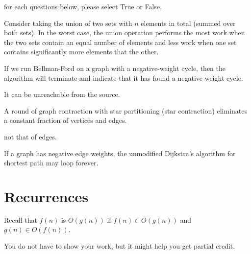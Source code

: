 \begin{problem}

for each questions below, please select True or False.

\asktf

Consider taking the union of two sets with $n$ elements in total
(summed over both sets).  In the worst case, the union operation
performs the most work when the two sets contain an equal number of
elements and less work when one set contains significantly more
elements that the other.

\solt



\asktf

If we run Bellman-Ford on a graph with a negative-weight cycle, then
the algorithm will terminate and indicate that it has found a
negative-weight cycle.

\solf
It can be unreachable from the source.


\asktf 

A round of graph contraction with star partitioning (star contraction)
eliminates a constant fraction of vertices and edges.

\solf
not that of edges.

\asktf

If a graph has negative edge weights, the unmodified Dijkstra's
algorithm for shortest path may loop forever.

\solf

\end{problem}

\section{Recurrences}

Recall that $f(n)$ is $\Theta(g(n))$
if $f(n) \in O(g(n))$ and $g(n) \in O(f(n))$.


\begin{note}
You do not have to show your work, but it might help you get partial credit.
\end{note}

